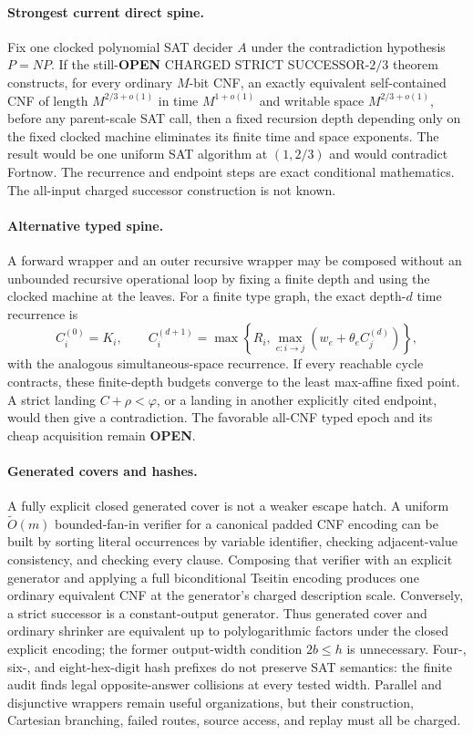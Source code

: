 \documentclass[11pt]{article}
\begin{document}
\paragraph{Strongest current direct spine.}
Fix one clocked polynomial SAT decider $A$ under the contradiction hypothesis
$P=NP$.  If the still-\textbf{OPEN} CHARGED STRICT SUCCESSOR-$2/3$ theorem
constructs, for every ordinary $M$-bit CNF, an exactly equivalent
self-contained CNF of length $M^{2/3+o(1)}$ in time $M^{1+o(1)}$ and writable
space $M^{2/3+o(1)}$, before any parent-scale SAT call, then a fixed recursion
depth depending only on the fixed clocked machine eliminates its finite time
and space exponents.  The result would be one uniform SAT algorithm at
$(1,2/3)$ and would contradict Fortnow.  The recurrence and endpoint steps are
exact conditional mathematics.  The all-input charged successor construction
is not known.

\paragraph{Alternative typed spine.}
A forward wrapper and an outer recursive wrapper may be composed without an
unbounded recursive operational loop by fixing a finite depth and using the
clocked machine at the leaves.  For a finite type graph, the exact depth-$d$
time recurrence is
\[
 C_i^{(0)}=K_i,
 \qquad
 C_i^{(d+1)}=
 \max\!\left\{R_i,\max_{e:i\to j}
       (w_e+\theta_e C_j^{(d)})\right\},
\]
with the analogous simultaneous-space recurrence.  If every reachable cycle
contracts, these finite-depth budgets converge to the least max-affine fixed
point.  A strict landing $C+\rho<\varphi$, or a landing in another explicitly
cited endpoint, would then give a contradiction.  The favorable all-CNF typed
epoch and its cheap acquisition remain \textbf{OPEN}.

\paragraph{Generated covers and hashes.}
A fully explicit closed generated cover is not a weaker escape hatch.  A
uniform $\widetilde O(m)$ bounded-fan-in verifier for a canonical padded CNF
encoding can be built by sorting literal occurrences by variable identifier,
checking adjacent-value consistency, and checking every clause.  Composing
that verifier with an explicit generator and applying a full biconditional
Tseitin encoding produces one ordinary equivalent CNF at the generator's
charged description scale.  Conversely, a strict successor is a
constant-output generator.  Thus generated cover and ordinary shrinker are
equivalent up to polylogarithmic factors under the closed explicit encoding;
the former output-width condition $2b\le h$ is unnecessary.  Four-, six-, and
eight-hex-digit hash prefixes do not preserve SAT semantics: the finite audit
finds legal opposite-answer collisions at every tested width.  Parallel and
disjunctive wrappers remain useful organizations, but their construction,
Cartesian branching, failed routes, source access, and replay must all be
charged.
\end{document}
